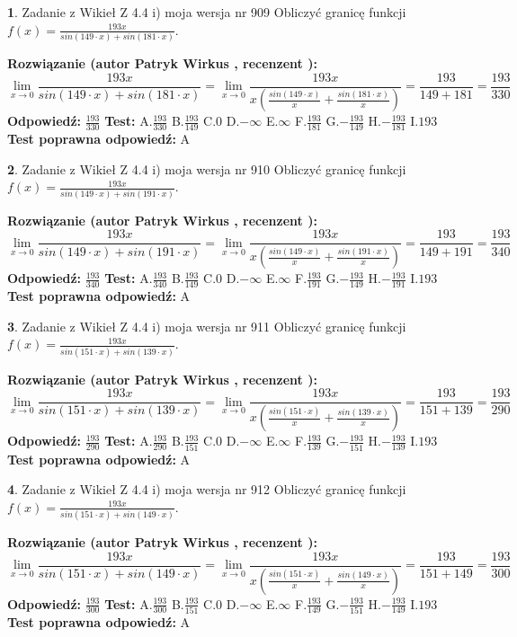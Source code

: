 \documentclass[12pt, a4paper]{article}
\theoremstyle{definition} %
\newtheorem{zad}{}
\newcommand{\zadStart}[1]{\begin{zad}#1\newline}
\newcommand{\zadStop}{\end{zad}}
\newcommand{\rozwStart}[2]{\noindent \textbf{Rozwiązanie (autor #1 , recenzent #2): }\newline}
\newcommand{\rozwStop}{\newline}
\newcommand{\odpStart}{\noindent \textbf{Odpowiedź:}\newline}
\newcommand{\odpStop}{\newline}
\newcommand{\testStart}{\noindent \textbf{Test:}\newline}
\newcommand{\testStop}{\newline}
\newcommand{\kluczStart}{\noindent \textbf{Test poprawna odpowiedź:}\newline}
\newcommand{\kluczStop}{\newline}
\begin{document}
\zadStart{Zadanie z Wikieł Z 4.4 i) moja wersja nr 909}
Obliczyć granicę funkcji $f(x)=\frac{193x}{sin(149\cdot x) +sin(181\cdot x)}$.
\zadStop
\rozwStart{Patryk Wirkus}{}
$$\lim\limits_{x\to 0}\frac{193x}{sin(149\cdot x) +sin(181\cdot x)}=\lim\limits_{x\to 0}\frac{193x}{x(\frac{sin(149\cdot x)}{x}+\frac{sin(181\cdot x)}{x})}=\frac{193}{149+181} = \frac{193}{330}$$
\rozwStop
\odpStart
$\frac{193}{330}$
\odpStop
\testStart
A.$\frac{193}{330}$
B.$\frac{193}{149}$
C.$0$
D.$-\infty$
E.$\infty$
F.$\frac{193}{181}$
G.$-\frac{193}{149}$
H.$-\frac{193}{181}$
I.$193$
\testStop
\kluczStart
A
\kluczStop



\zadStart{Zadanie z Wikieł Z 4.4 i) moja wersja nr 910}
Obliczyć granicę funkcji $f(x)=\frac{193x}{sin(149\cdot x) +sin(191\cdot x)}$.
\zadStop
\rozwStart{Patryk Wirkus}{}
$$\lim\limits_{x\to 0}\frac{193x}{sin(149\cdot x) +sin(191\cdot x)}=\lim\limits_{x\to 0}\frac{193x}{x(\frac{sin(149\cdot x)}{x}+\frac{sin(191\cdot x)}{x})}=\frac{193}{149+191} = \frac{193}{340}$$
\rozwStop
\odpStart
$\frac{193}{340}$
\odpStop
\testStart
A.$\frac{193}{340}$
B.$\frac{193}{149}$
C.$0$
D.$-\infty$
E.$\infty$
F.$\frac{193}{191}$
G.$-\frac{193}{149}$
H.$-\frac{193}{191}$
I.$193$
\testStop
\kluczStart
A
\kluczStop



\zadStart{Zadanie z Wikieł Z 4.4 i) moja wersja nr 911}
Obliczyć granicę funkcji $f(x)=\frac{193x}{sin(151\cdot x) +sin(139\cdot x)}$.
\zadStop
\rozwStart{Patryk Wirkus}{}
$$\lim\limits_{x\to 0}\frac{193x}{sin(151\cdot x) +sin(139\cdot x)}=\lim\limits_{x\to 0}\frac{193x}{x(\frac{sin(151\cdot x)}{x}+\frac{sin(139\cdot x)}{x})}=\frac{193}{151+139} = \frac{193}{290}$$
\rozwStop
\odpStart
$\frac{193}{290}$
\odpStop
\testStart
A.$\frac{193}{290}$
B.$\frac{193}{151}$
C.$0$
D.$-\infty$
E.$\infty$
F.$\frac{193}{139}$
G.$-\frac{193}{151}$
H.$-\frac{193}{139}$
I.$193$
\testStop
\kluczStart
A
\kluczStop



\zadStart{Zadanie z Wikieł Z 4.4 i) moja wersja nr 912}
Obliczyć granicę funkcji $f(x)=\frac{193x}{sin(151\cdot x) +sin(149\cdot x)}$.
\zadStop
\rozwStart{Patryk Wirkus}{}
$$\lim\limits_{x\to 0}\frac{193x}{sin(151\cdot x) +sin(149\cdot x)}=\lim\limits_{x\to 0}\frac{193x}{x(\frac{sin(151\cdot x)}{x}+\frac{sin(149\cdot x)}{x})}=\frac{193}{151+149} = \frac{193}{300}$$
\rozwStop
\odpStart
$\frac{193}{300}$
\odpStop
\testStart
A.$\frac{193}{300}$
B.$\frac{193}{151}$
C.$0$
D.$-\infty$
E.$\infty$
F.$\frac{193}{149}$
G.$-\frac{193}{151}$
H.$-\frac{193}{149}$
I.$193$
\testStop
\kluczStart
A
\kluczStop
\end{document}
